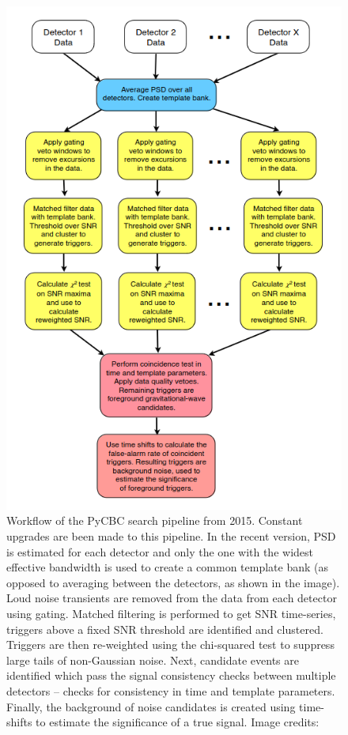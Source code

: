 \begin{figure}
    \centering
    \includegraphics[width=0.75\linewidth]{figures/basic_data_analysis/search_workflow.png}
    \caption{Workflow of the PyCBC search pipeline from 2015. Constant upgrades are been made to this pipeline. In the recent version, PSD is estimated for each detector and only the one with the widest effective bandwidth is used to create a common template bank (as opposed to averaging between the detectors, as shown in the image). Loud noise transients are removed from the data from each detector using gating. Matched filtering is performed to get SNR time-series, triggers above a fixed SNR threshold are identified and clustered. Triggers are then re-weighted using the chi-squared test to suppress large tails of non-Gaussian noise. Next, candidate events are identified which pass the signal consistency checks between multiple detectors -- checks for consistency in time and template parameters. Finally, the background of noise candidates is created using time-shifts to estimate the significance of a true signal. Image credits: \cite{Usman_pycbc}}
    \label{fig:pycbc_search_workflow}
\end{figure}

